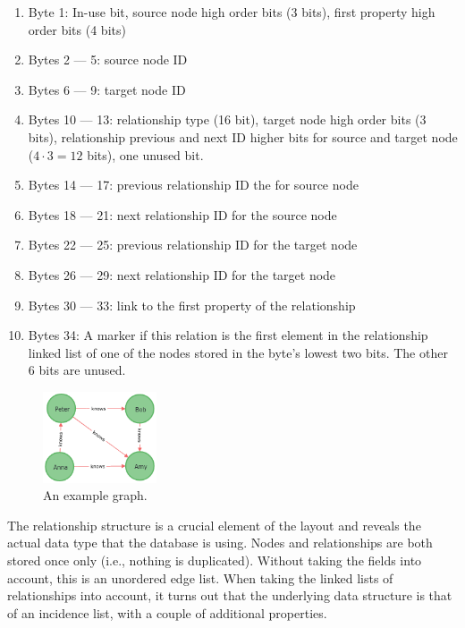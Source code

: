         \begin{enumerate}
            \item Byte 1: In-use bit, source node high order bits (3 bits), first property high order bits (4 bits)
            \item Bytes 2 --- 5: source node ID 
            \item Bytes 6 --- 9: target node ID 
            \item Bytes 10 --- 13: relationship type (16 bit), target node high order bits (3 bits), relationship previous and next ID higher bits for source and target node ($4 \cdot 3 = 12$ bits), one unused bit.
            \item Bytes 14 --- 17: previous relationship ID the for source node
            \item Bytes 18 --- 21: next relationship ID for the source node
            \item Bytes 22 --- 25: previous relationship ID for the target node
            \item Bytes 26 --- 29: next relationship ID for the target node
            \item Bytes 30 --- 33: link to the first property of the relationship
            \item Bytes 34: A marker if this relation is the first element in the relationship linked list of one of the nodes stored in the byte's lowest two bits. 
            The other 6 bits are unused.
        \end{enumerate}
        
        \begin{figure}[htp]
            \begin{center}
                \includegraphics[keepaspectratio,height=0.4\textheight,width=0.3\textwidth]{img/04-databases/graph.png}
            \end{center}
            \caption{An example graph.}
            \label{n4j-ex-gr}
        \end{figure}
        
        The relationship structure is a crucial element of the layout and reveals the actual data type that the database is using.
        Nodes and relationships are both stored once only (i.e., nothing is duplicated).
        Without taking the fields into account, this is an unordered edge list.
        When taking the linked lists of relationships into account, it turns out that the underlying data structure is that of an incidence list, with a couple of additional properties.
        
